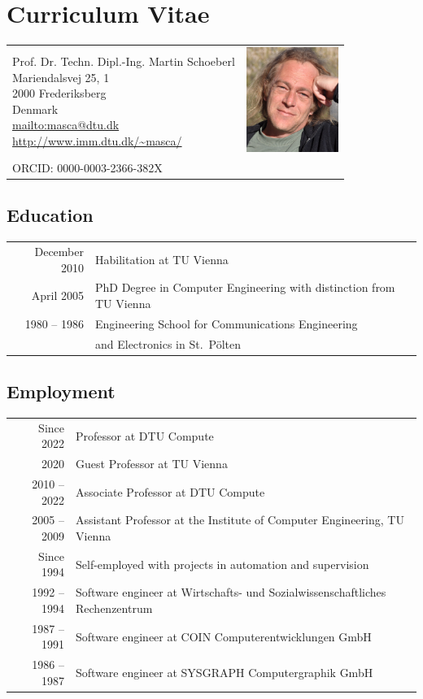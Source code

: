 \documentclass[%
    a4paper,
    11pt, %
    headinclude, footexclude,
    notitlepage,
    headsepline,
    pointlessnumbers,
    ]{scrartcl}
\begin{document}
\newpage

\section*{Curriculum Vitae}


\begin{tabular*}{0.7\textwidth}[h!]{@{\extracolsep{\fill} } l r}
\parbox[b]{11 cm}{Prof. Dr. Techn. Dipl.-Ing. Martin Schoeberl\\
Mariendalsvej 25, 1\\
2000 Frederiksberg\\
Denmark\\
\url{mailto:masca@dtu.dk}\\
\url{http://www.imm.dtu.dk/~masca/}} &
\includegraphics[width=3cm]{martin_small}\\
ORCID: 0000-0003-2366-382X
\end{tabular*}

\subsection*{Education}

\begin{tabular}{rl}
December 2010 & Habilitation at TU Vienna \\
April 2005   & PhD Degree in Computer Engineering with distinction from TU Vienna\\
1980 -- 1986 & Engineering School for Communications Engineering\\
              & and Electronics in St.\ P\"olten\\
\end{tabular}

\subsection*{Employment}
\begin{tabular}{rl}
Since 2022    & Professor at DTU Compute\\
 2020 & Guest Professor at TU Vienna\\
2010 -- 2022   & Associate Professor at DTU Compute\\
2005 -- 2009 & Assistant Professor at the Institute of Computer Engineering, TU Vienna\\
Since 1994   & Self-employed with projects in automation and supervision\\
1992 -- 1994 & Software engineer at Wirtschafts- und Sozialwissenschaftliches Rechenzentrum\\
1987 -- 1991 & Software engineer at COIN Computerentwicklungen GmbH\\
1986 -- 1987 & Software engineer at SYSGRAPH Computergraphik GmbH\\
\end{tabular}
\end{document}
